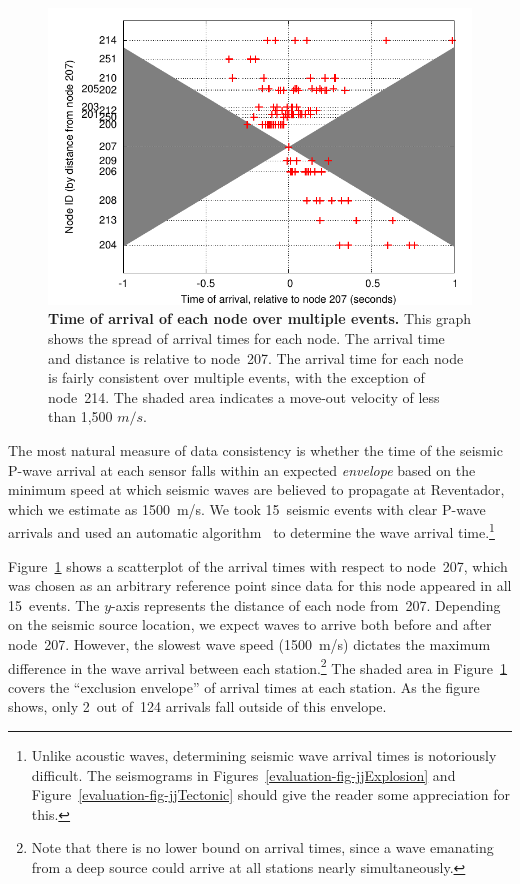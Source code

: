 \begin{figure}[t]
\label{evaluation-fig-seismicArrivalScatteredNode}
\begin{center}
\includegraphics[width=\hsize]{./5-evaluation/figs/fidelity/seismicArrival/arrivalTimesPlotScatteredNode.pdf}
\end{center}
\caption{\textbf{Time of arrival of each node over multiple events.}
This graph shows the spread of arrival times for each node.  The arrival time
and distance is relative to node~207.  The arrival time for each node is
fairly consistent over multiple events, with the exception of node~214.  The
shaded area indicates a move-out velocity of less than 1,500 $m/s$.}
\end{figure}

The most natural measure of data consistency is whether the time of the
seismic P-wave arrival at each sensor falls within an expected {\em envelope}
based on the minimum speed at which seismic waves are believed to propagate
at Reventador, which we estimate as 1500~m/s. We took 15~seismic events with
clear P-wave arrivals and used an automatic algorithm~\cite{pwave-picking} to
determine the wave arrival time.\footnote{Unlike acoustic waves, determining
seismic wave arrival times is notoriously difficult. The seismograms in
Figures~\ref{evaluation-fig-jjExplosion} and Figure~\ref{evaluation-fig-jjTectonic} should give the
reader some appreciation for this.} 

Figure~\ref{evaluation-fig-seismicArrivalScatteredNode} shows a scatterplot
of the arrival times with respect to node~207, which was chosen as an
arbitrary reference point since data for this node appeared in all 15~events.
The $y$-axis represents the distance of each node from~207. Depending on the
seismic source location, we expect waves to arrive both before and after
node~207.  However, the slowest wave speed (1500~m/s) dictates the maximum
difference in the wave arrival between each station.\footnote{Note that there
is no lower bound on arrival times, since a wave emanating from a deep source
could arrive at all stations nearly simultaneously.} The shaded area in
Figure~\ref{evaluation-fig-seismicArrivalScatteredNode} covers the
``exclusion envelope'' of arrival times at each station.  As the figure
shows, only 2~out of~124 arrivals fall outside of this envelope.

